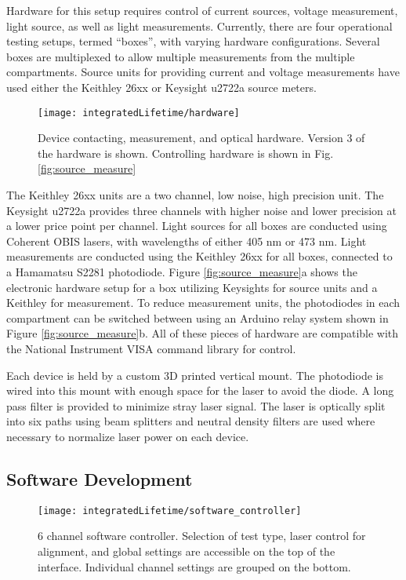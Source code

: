 \documentclass[../thesis.tex]{subfiles}
\begin{document}
Hardware for this setup requires control of current sources, voltage measurement, light source, as well as light measurements. 
Currently, there are four operational testing setups, termed ``boxes'', with varying hardware configurations.
Several boxes are multiplexed to allow multiple measurements from the multiple compartments.
Source units for providing current and voltage measurements have used either the Keithley 26xx or Keysight u2722a source meters.  
\begin{wrapfigure}{r}{.5\textwidth}
\centering
\texttt{[image: integratedLifetime/hardware]}
\caption{Device contacting, measurement, and optical hardware.  Version 3 of the hardware is shown.  Controlling hardware is shown in Fig. \ref{fig:source_measure}}
\label{fig:hardware}
\end{wrapfigure}
The Keithley 26xx units are a two channel, low noise, high precision unit.
The Keysight u2722a provides three channels with higher noise and lower precision at a lower price point per channel.
Light sources for all boxes are conducted using Coherent OBIS lasers, with wavelengths of either 405 nm or 473 nm.
Light measurements are conducted using the Keithley 26xx for all boxes, connected to a Hamamatsu S2281 photodiode.
Figure \ref{fig:source_measure}a shows the electronic hardware
 setup for a box utilizing Keysights for source units and a Keithley for measurement.
To reduce measurement units, the photodiodes in each compartment can be switched between using an Arduino relay system shown in Figure \ref{fig:source_measure}b.
All of these pieces of hardware are compatible with the National Instrument VISA command library for control.


Each device is held by a custom 3D printed vertical mount.  
The photodiode is wired into this mount with enough space for the laser to avoid the diode.
A long pass filter is provided to minimize stray laser signal.
The laser is optically split into six paths using beam splitters and neutral density filters are used where necessary to normalize laser power on each device.


\subsection{Software Development}

\begin{figure}[ht]
    \centering
    \texttt{[image: integratedLifetime/software\_controller]}
\caption{6 channel software controller.  Selection of test type, laser control for alignment, and global settings are accessible on the top of the interface.  Individual channel settings are grouped on the bottom.}
\label{fig:software_controller}
\end{figure}
\end{document}

